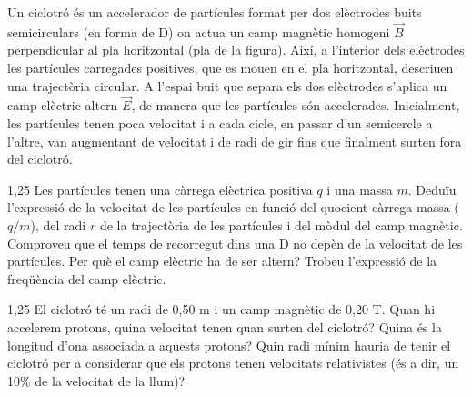 Un ciclotró és un accelerador de partícules format per dos elèctrodes buits semicirculars (en forma de D) on actua un camp magnètic homogeni $\vec{B}$ perpendicular al pla horitzontal (pla de la figura). Així, a l'interior dels elèctrodes les partícules carregades positives, que es mouen en el pla horitzontal, descriuen una trajectòria circular. A l'espai buit que separa els dos elèctrodes s'aplica un camp elèctric altern $\vec{E}$, de manera que les partícules són accelerades. Inicialment, les partícules tenen poca velocitat i a cada cicle, en passar d'un semicercle a l'altre, van augmentant de velocitat i de radi de gir fins que finalment surten fora del ciclotró.


\begin{apartat}{1,25}
Les partícules tenen una càrrega elèctrica positiva $q$ i una massa $m$. Deduïu l'expressió de la velocitat de les partícules en funció del quocient càrrega-massa ($q/m$), del radi $r$ de la trajectòria de les partícules i del mòdul del camp magnètic. Comproveu que el temps de recorregut dins una D no depèn de la velocitat de les partícules. Per què el camp elèctric ha de ser altern? Trobeu l'expressió de la freqüència del camp elèctric.
\end{apartat}

\begin{apartat}{1,25}
El ciclotró té un radi de 0,50 m i un camp magnètic de 0,20 T. Quan hi accelerem protons, quina velocitat tenen quan surten del ciclotró? Quina és la longitud d'ona associada a aquests protons? Quin radi mínim hauria de tenir el ciclotró per a considerar que els protons tenen velocitats relativistes (és a dir, un 10\% de la velocitat de la llum)?
\end{apartat}

